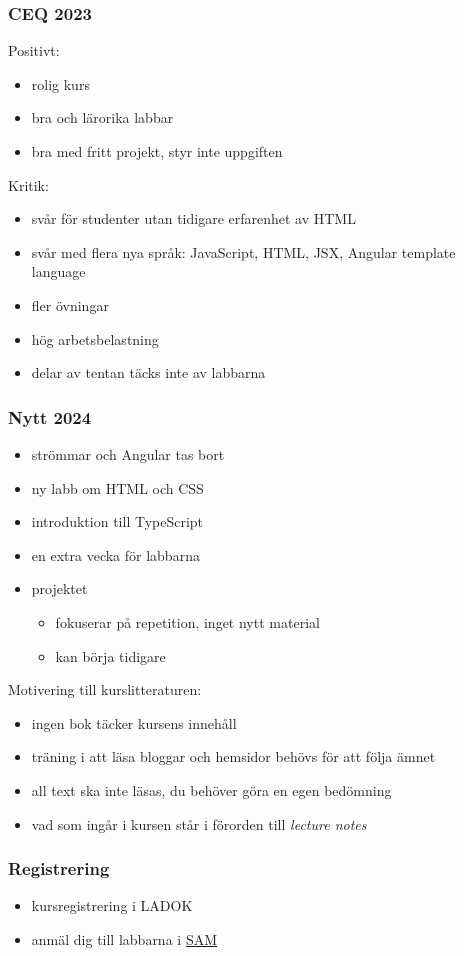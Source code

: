 \documentclass[aspectratio=1610]{beamer}
\begin{document}
\begin{frame}
  \frametitle{CEQ 2023}
Positivt:
\begin{itemize}
  \item rolig kurs
  \item bra och lärorika labbar
  \item bra med fritt projekt, styr inte uppgiften
\end{itemize}
\vspace{2mm}
Kritik:
\begin{itemize}
  \item svår för studenter utan tidigare erfarenhet av HTML
  \item svår med flera nya språk: JavaScript, HTML, JSX, Angular template language
  \item fler övningar
  \item hög arbetsbelastning
  \item delar av tentan täcks inte av labbarna
\end{itemize}
\end{frame}

\begin{frame}
  \frametitle{Nytt 2024}
\begin{itemize}
  \item strömmar och Angular tas bort
  \item ny labb om HTML och CSS
  \item introduktion till TypeScript
  \item en extra vecka för labbarna
  \item projektet
  \begin{itemize}
    \item fokuserar på repetition, inget nytt material
    \item kan börja tidigare
  \end{itemize}
\end{itemize}
Motivering till kurslitteraturen:
\begin{itemize}
  \item ingen bok täcker kursens innehåll
  \item träning i att läsa bloggar och hemsidor behövs för att följa ämnet
  \item all text ska inte läsas, du behöver göra en egen bedömning
  \item vad som ingår i kursen står i förorden till \emph{lecture notes}
\end{itemize}
\end{frame}

\begin{frame}
  \frametitle{Registrering}
\begin{itemize}
  \item kursregistrering i LADOK
  \item anmäl dig till labbarna i \href{https://sam.cs.lth.se/Labs}{SAM}
\end{itemize}

\end{frame}

\begin{frame}[plain]
  \endpage
\end{frame}

\end{document}
